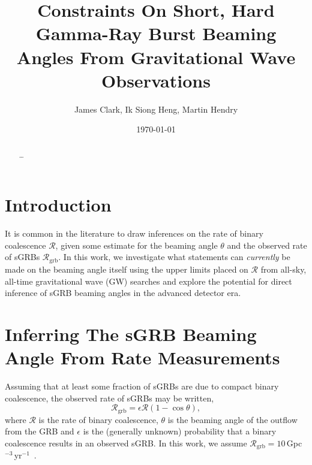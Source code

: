 \documentclass[twocolumn,nofootinbib]{revtex4-1}
\newcommand{\grbrate}{{{\mathcal R}_{\mathrm{grb}}}}
\newcommand{\cbcrate}{{{\mathcal R}}}
\def\gw#1{gravitational wave#1 (GW#1)\gdef\gw{GW}}
\begin{document}
\title{Constraints On Short, Hard Gamma-Ray Burst Beaming Angles From
Gravitational Wave Observations}
\author{James Clark, Ik Siong Heng, Martin Hendry}
\date{\today}

\begin{abstract}
\dots
\end{abstract}

\maketitle

\section{Introduction}

It is common in the literature to draw inferences on the rate of binary
coalescence $\cbcrate$, given some estimate for the beaming angle $\theta$ and
the observed rate of sGRBs $\grbrate$.  In this work, we investigate what
statements can \emph{currently} be made on the beaming angle itself using the
upper limits placed on $\cbcrate$ from all-sky, all-time \gw{} searches and
explore the potential for direct inference of sGRB  beaming angles in the
advanced detector era.

\section{Inferring The sGRB Beaming Angle From Rate Measurements}
Assuming that at least some fraction of sGRBs are due to compact binary
coalescence, the observed rate of sGRBs may be written,
%
\begin{equation}\label{eq:rate2angle}
\grbrate=\epsilon\cbcrate(1-\cos \theta),
\end{equation}
%
where $\cbcrate$ is the rate of binary coalescence, $\theta$ is the beaming
angle of the outflow from the GRB and $\epsilon$ is the (generally unknown)
probability that a binary coalescence results in an observed sGRB.  In this
work, we assume
$\grbrate=10$\,Gpc$^{-3}$\,yr$^{-1}$~\cite{nakar-2007,Dietz11}.
 
\end{document}
